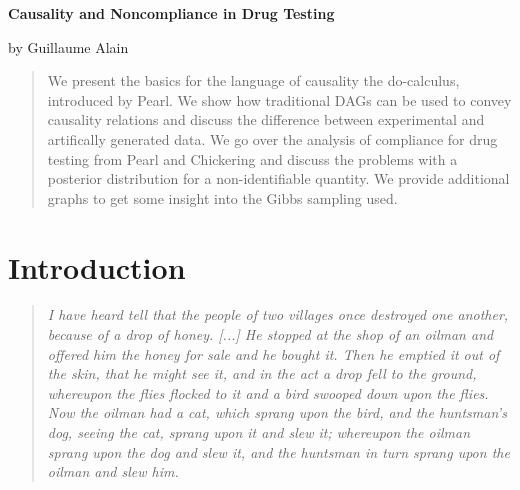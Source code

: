 \documentclass[a4paper, 10pt]{article}
\begin{document}
\setlength{\parindent}{0pt}
\setlength{\parskip}{2ex plus 0.5ex minus 0.2ex}




\begin{Large}\textbf{Causality and Noncompliance in Drug Testing}\end{Large}

by Guillaume Alain

\begin{abstract}
We present the basics for the language of causality the do-calculus, introduced
by Pearl. We show how traditional DAGs can be used to convey causality
relations and discuss the difference between experimental and artifically
generated data. We go over the analysis of compliance for drug testing from
Pearl and Chickering and discuss the problems with a posterior distribution for
a non-identifiable quantity. We provide additional graphs to get some insight
into the Gibbs sampling used.
\end{abstract}


\section{Introduction}

\begin{quote}
\emph{I have heard tell that the people of two villages once destroyed one
another, because of a drop of honey. [...] He stopped at the shop of an oilman
and offered him the honey for sale and he bought it. Then he emptied it out of
the skin, that he might see it, and in the act a drop fell to the ground,
whereupon the flies flocked to it and a bird swooped down upon the flies. Now
the oilman had a cat, which sprang upon the bird, and the huntsman’s dog, seeing
the cat, sprang upon it and slew it; whereupon the oilman sprang upon the dog
and slew it, and the huntsman in turn sprang upon the oilman and slew him.
} 
\end{quote}
\end{document}
